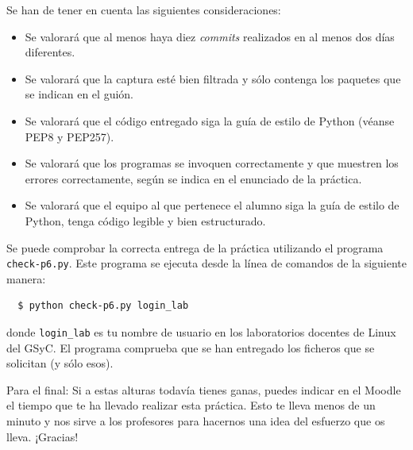 \documentclass[a4paper,11pt]{article}
\begin{document}
Se han de tener en cuenta las siguientes consideraciones:
\begin{itemize}
  \item Se valorará que al menos haya diez \emph{commits} realizados en al menos dos días diferentes.
  \item Se valorará que la captura esté bien filtrada y sólo contenga los paquetes que se indican en el guión.
  \item Se valorará que el código entregado siga la guía de estilo de Python (véanse PEP8 y PEP257).
  \item Se valorará que los programas se invoquen correctamente y que muestren los errores correctamente, según se indica en el enunciado de la práctica.
  \item Se valorará que el equipo al que pertenece el alumno siga la guía de estilo
de Python, tenga código legible y bien estructurado.
\end{itemize}

Se puede comprobar la correcta entrega de la práctica utilizando el programa \texttt{check-p6.py}. Este programa se ejecuta desde la línea de comandos de la siguiente manera:
\begin{verbatim}
  $ python check-p6.py login_lab
\end{verbatim}


donde \texttt{login\_lab} es tu nombre de usuario en los laboratorios docentes de Linux del GSyC. El programa comprueba que se han entregado los ficheros que se solicitan (y sólo esos).


\vspace{1cm}

\footnotesize{Para el final: Si a estas alturas todavía tienes ganas, puedes indicar en el Moodle el tiempo que te ha llevado realizar esta práctica. Esto te lleva menos de un minuto y nos sirve a los profesores para hacernos una idea del esfuerzo que os lleva. ¡Gracias!}


%
%
\end{document}
